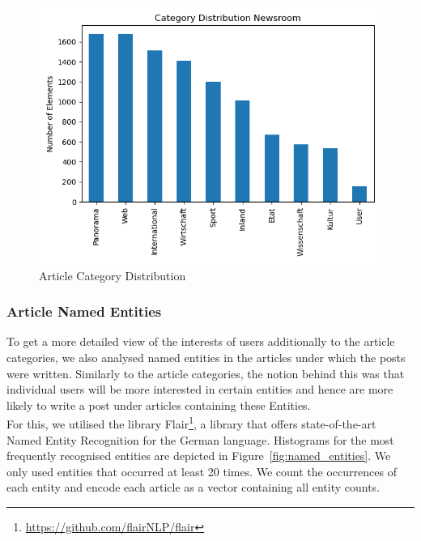 \documentclass[acmsmall]{acmart}
\begin{document}
\begin{figure}[H]
\includegraphics[width=.5\linewidth]{assets/Category_Distribution_Newsroom.png}
\caption{Article Category Distribution}
\label{fig:article_categories}
\end{figure}


\subsubsection{Article Named Entities}
To get a more detailed view of the interests of users additionally to the article categories, we also analysed named entities in the articles under which the posts were written. Similarly to the article categories, the notion behind this was that individual users will be more interested in certain entities and hence are more likely to write a post under articles containing these Entities. \\
For this, we utilised the library Flair\footnote{\url{https://github.com/flairNLP/flair}}, a library that offers state-of-the-art Named Entity Recognition for the German language. Histograms for the most frequently recognised entities are depicted in Figure~\ref{fig:named_entities}. We only used entities that occurred at least 20 times. We count the occurrences of each entity and encode each article as a vector containing all entity counts. 
\end{document}
